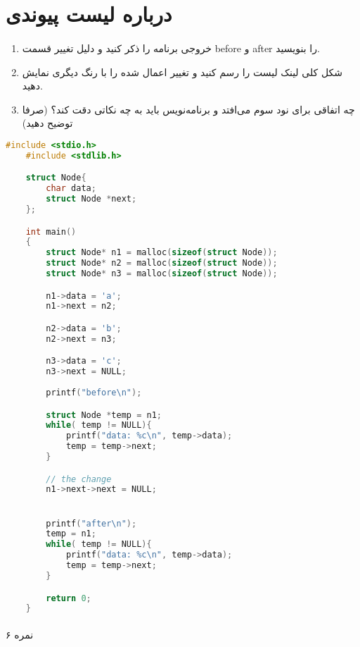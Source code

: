\documentclass[../main.tex]{subfiles}
\begin{document}
\section{درباره لیست پیوندی}
\paragraph{}
\begin{enumerate}
    \item خروجی برنامه را ذکر کنید و دلیل تغییر قسمت before و after را بنویسید.
    \item شکل کلی لینک لیست را رسم کنید و تغییر اعمال شده را با رنگ دیگری نمایش دهید.
    \item چه اتفاقی برای نود سوم می‌افتد و برنامه‌نویس باید به چه نکاتی دقت کند؟ (صرفا توضیح دهید)
    
\end{enumerate}

\begin{latin}
\begin{lstlisting}[language=c]
    #include <stdio.h>
    #include <stdlib.h>

    struct Node{
        char data;
        struct Node *next;
    };

    int main()
    {
        struct Node* n1 = malloc(sizeof(struct Node));
        struct Node* n2 = malloc(sizeof(struct Node));
        struct Node* n3 = malloc(sizeof(struct Node));

        n1->data = 'a';
        n1->next = n2;

        n2->data = 'b';
        n2->next = n3;

        n3->data = 'c';
        n3->next = NULL;
        
        printf("before\n");

        struct Node *temp = n1;
        while( temp != NULL){
            printf("data: %c\n", temp->data);
            temp = temp->next;
        }

        // the change
        n1->next->next = NULL;


        printf("after\n");
        temp = n1;
        while( temp != NULL){
            printf("data: %c\n", temp->data);
            temp = temp->next;
        }

        return 0;
    }
\end{lstlisting}
\end{latin}


\paragraph{}
۶ نمره
\end{document}
